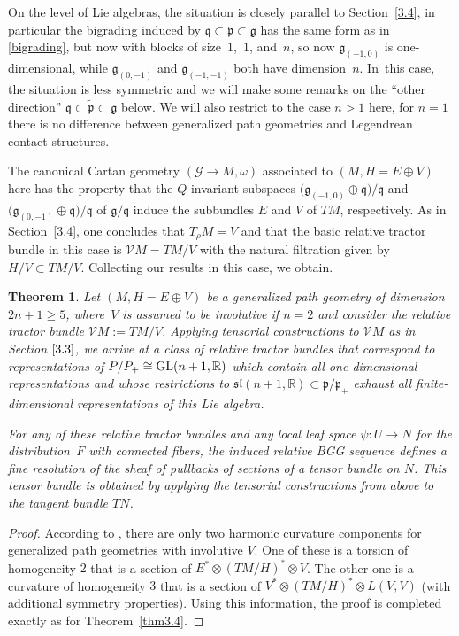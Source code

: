 \documentclass[10pt,a4paper]{amsart}
\numberwithin{equation}{section}
\newtheorem{Theorem}{Theorem}[section]
\def\frak{\mathfrak}
\def\Bbb{\mathbb}
\def\Cal{\mathcal}
\newcommand{\om}{\omega}
\begin{document}
On the level of Lie algebras, the situation is closely parallel to Section~\ref{3.4}, in
particular the bigrading induced by $\frak q\subset\frak p\subset\frak g$ has the
same form as in \eqref{bigrading}, but now with blocks of size~$1$,~$1$, and~$n$, so
now $\frak g_{(-1,0)}$ is one-dimensional, while $\frak g_{(0,-1)}$ and
$\frak g_{(-1,-1)}$ both have dimension~$n$. In~this case, the situation is less
symmetric and we will make some remarks on the ``other direction'' $\frak
q\subset\tilde{\frak p}\subset\frak g$ below. We will also restrict to the case $n>1$
here, for $n=1$ there is no difference between generalized path geometries and
Legendrean contact structures.

The canonical Cartan geometry $(\Cal G\to M,\om)$ associated to $(M,H=E\oplus V)$
here has the property that the $Q$-invariant subspaces
$\bigl(\frak g_{(-1,0)}\oplus\frak q\bigr)/\frak q$ and
$\bigl(\frak g_{(0,-1)}\oplus\frak q\bigr)/\frak q$ of $\frak g/\frak q$ induce the subbundles
$E$ and $V$ of $TM$, respectively. As in Section~\ref{3.4}, one concludes that $T_\rho M=V$
and that the basic relative tractor bundle in this case is $\Cal VM=TM/V$ with the
natural filtration given by $H/V\subset TM/V$. Collecting our results in this case,
we obtain.

\begin{Theorem}\label{thm3.5}
 Let $(M,H=E\oplus V)$ be a generalized path geometry of dimension $2n+1\geq 5$,
 where~$V$ is assumed to be involutive if $n=2$ and consider the relative tractor
 bundle $\Cal VM:=TM/V$. Applying tensorial constructions to $\Cal VM$ as in Section
 $\ref{3.3}$, we arrive at a class of relative tractor bundles that correspond to
 representations of $P/P_+\cong {\rm GL}(n+1,\Bbb R)$ which contain all one-dimensional
 representations and whose restrictions to
 $\frak{sl}(n+1,\Bbb R)\subset\frak p/\frak p_+$ exhaust all finite-dimensional
 representations of this Lie algebra.

 For any of these relative tractor bundles and any local leaf space $\psi\colon U\to N$ for
 the distribution~$F$ with connected fibers, the induced relative BGG sequence
 defines a fine resolution of the sheaf of pullbacks of sections of a tensor bundle
 on $N$. This tensor bundle is obtained by applying the tensorial constructions from
 above to the tangent bundle $TN$.
\end{Theorem}
\begin{proof}
 According to \cite[Section 4.4.3]{book}, there are only two harmonic curvature
 components for generalized path geometries with involutive $V$. One of these is a
 torsion of homogeneity $2$ that is a section of $E^*\otimes (TM/H)^*\otimes V$. The
 other one is a curvature of homogeneity $3$ that is a section of $V^*\otimes
 (TM/H)^*\otimes L(V,V)$ (with additional symmetry properties). Using this
 information, the proof is completed exactly as for Theorem~\ref{thm3.4}.
\end{proof}
\end{document}

